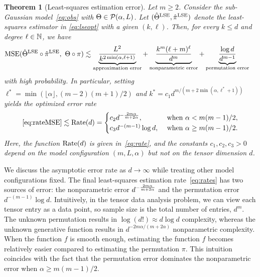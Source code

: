 \documentclass[12pt]{article}
\newtheorem{thm}{Theorem}
\theoremstyle{definition}
\newcommand*{\KeepStyleUnderBrace}[1]{%
  \mathop{%
    \mathchoice
    {\underbrace{\displaystyle#1}}%
    {\underbrace{\textstyle#1}}%
    {\underbrace{\scriptstyle#1}}%
    {\underbrace{\scriptscriptstyle#1}}%
  }\limits
}
\begin{document}
\begin{thm}[Least-squares estimation error]\label{thm:LSE} Let $m\geq 2$. Consider the sub-Gaussian model~\eqref{eq:obs} with $\Theta\in\mathcal{P}(\alpha,L)$. Let $(\hat\Theta^{\textup{LSE}},\hat\pi^{\textup{LSE}})$ denote the least-squares estimator in \eqref{eq:lseopt} with a given $(k,\ell)$. Then, for every $k\leq d$ and degree $\ell\in \mathbb{N}$, we have
\begin{align}\label{eq:rateMSE}
\textup{MSE}(\hat\Theta^{\textup{LSE}}\circ\hat\pi^{\textup{LSE}},\ \Theta\circ\pi)&\lesssim \KeepStyleUnderBrace{\frac{L^2}{k^{2\min(\alpha,\ell+1)}}}_{\textup{approximation error}}+ \KeepStyleUnderBrace{\frac{k^m(\ell+m)^\ell}{d^m}}_{\textup{nonparametric error}}+\KeepStyleUnderBrace{\frac{\log d}{d^{m-1}}}_{\textup{permutation error}}
\end{align}
with high probability. In particular, setting {\small $\ell^* = \min(\lfloor \alpha\rfloor,(m-2)(m+1)/2)$} and $k^*=c_1 d^{m/(m+2\min(\alpha,\ell^*+1))}$
yields the optimized error rate
\begin{align}\label{eq:rates}
     \eqref{eq:rateMSE} \lesssim   \textup{Rate}(d) =
     \begin{cases} 
    c_2 d^{-\frac{2m\alpha}{m+2\alpha}}, & \text{ when } \alpha < m(m-1)/2,\\
     c_3 d^{-(m-1)}\log d, &\text{ when } \alpha \geq m(m-1)/2.
    \end{cases}
\end{align}
Here, the function $\textup{Rate}(d)$ is given in~\eqref{eq:rate}, and the constants $c_1,c_2,c_3>0$ depend on the model configuration $(m, L,\alpha)$ but not on the tensor dimension $d$. \end{thm}

We discuss the asymptotic error rate as $d\rightarrow \infty$ while treating other model configurations fixed. The final least-squares estimation rate~\eqref{eq:rates} has two sources of error: the nonparametric error $d^{-{2m\alpha\over m+2\alpha}}$ and the permutation error $d^{-(m-1)}\log d$. Intuitively, in the tensor data analysis problem, we can view each tensor entry as a data point, so sample size is the total number of entries, $d^m$. The unknown permutation results in $\log(d!)\approx d\log d$ complexity, whereas the unknown generative function results in $d^{-2m\alpha/(m+2\alpha)}$ nonparametric complexity. When the function $f$ is smooth enough, estimating the function $f$ becomes relatively easier compared to estimating the permutation $\pi$. This intuition coincides with the fact that the permutation error dominates the nonparametric error when  $\alpha\geq m(m-1)/2$. 
\end{document}
